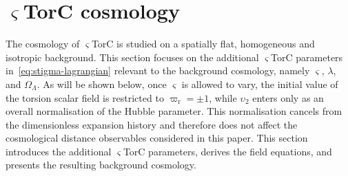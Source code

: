 \documentclass[aps,prd,reprint,preprintnumbers,showpacs,floatfix,nofootinbib,superscriptaddress]{revtex4-2}
\newcommand{\cprr}{\varpi_\mathrm{r}}
\begin{document}
\section{$\varsigma$TorC cosmology}
\label{sec:stigma-cosmology}
The cosmology of $\varsigma$TorC is studied on a spatially flat, homogeneous and isotropic background. This section focuses on the additional $\varsigma$TorC parameters in~\cref{eq:stigma-lagrangian} relevant to the background cosmology, namely $\varsigma$, $\lambda$, and $\Omega_\Lambda$. As will be shown below, once $\varsigma$ is allowed to vary, the initial value of the torsion scalar field is restricted to $\cprr=\pm1$, while $\upsilon_2$ enters only as an overall normalisation of the Hubble parameter. This normalisation cancels from the dimensionless expansion history and therefore does not affect the cosmological distance observables considered in this paper. This section introduces the additional $\varsigma$TorC parameters, derives the field equations, and presents the resulting background cosmology.
\end{document}
